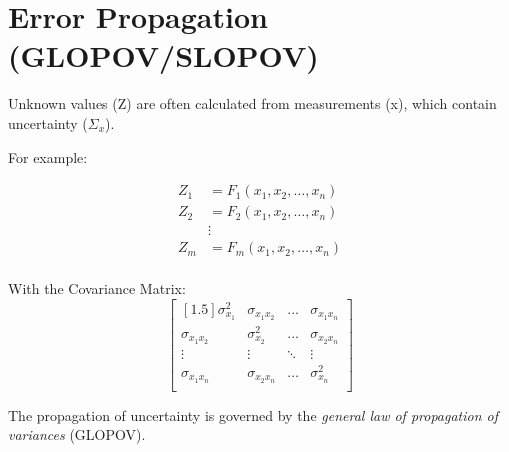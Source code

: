 \section{Error Propagation (GLOPOV/SLOPOV)}
Unknown values (Z) are often calculated from measurements (x), which contain uncertainty ($\Sigma_x$).  

For example:

\begin{align*}
Z_1 &= F_1(x_1,x_2,\dots,x_n) \\
Z_2 &= F_2(x_1,x_2,\dots,x_n) \\
&\vdots \\
Z_m &= F_m(x_1,x_2,\dots,x_n) \\
\end{align*}

With the Covariance Matrix:
\[
\begin{bmatrix}[1.5]
\sigma^2_{x_{1}} & \sigma_{x_{1}x_{2}} & \hdots & \sigma_{x_{1}x_{n}} \\
\sigma_{x_{1}x_{2}} & \sigma^2_{x_{2}} & \hdots & \sigma_{x_{2}x_{n}} \\
\vdots & \vdots & \ddots & \vdots \\
\sigma_{x_{1}x_{n}} & \sigma_{x_{2}x_{n}} & \hdots & \sigma^2_{x_{n}} \\
\end{bmatrix}
\]

The propagation of uncertainty is governed by the \textit{general law of propagation of variances} (GLOPOV).
